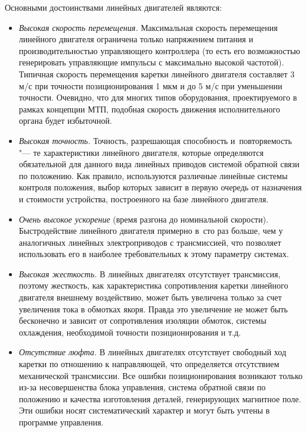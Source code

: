 Основными достоинствами линейных двигателей являются:

\begin{itemize}
	\item \textit{Высокая скорость перемещения.} Максимальная скорость перемещения линейного двигателя ограничена только напряжением питания и производительностью управляющего контроллера (то есть его возможностью генерировать управляющие импульсы с максимально высокой частотой). Типичная скорость перемещения каретки линейного двигателя составляет 3 м/с при точности позиционирования 1 мкм и до 5 м/с при уменьшении точности. Очевидно, что для многих типов оборудования, проектируемого в рамках концепции МТП, подобная скорость движения исполнительного органа будет избыточной.
	
	\item \textit{Высокая точность.} Точность, разрешающая способность и~повторяемость "--- те характеристики линейного двигателя, которые определяются обязательной для данного вида линейных приводов системой обратной связи по положению. Как правило, используются различные линейные системы контроля положения, выбор которых зависит в первую очередь от назначения и стоимости устройства, построенного на базе линейного двигателя.
	
	\item \textit{Очень высокое ускорение} (время разгона до номинальной скорости). Быстродействие линейного двигателя примерно в~сто раз больше, чем у аналогичных линейных электроприводов с трансмиссией, что позволяет использовать его в наиболее требовательных к этому параметру системах.
	
	\item \textit{Высокая жесткость.} В линейных двигателях отсутствует трансмиссия, поэтому жесткость, как характеристика сопротивления каретки линейного двигателя внешнему воздействию, может быть увеличена только за счет увеличения тока в обмотках якоря. Правда это увеличение не может быть бесконечно и зависит от сопротивления изоляции обмоток, системы охлаждения, необходимой точности позиционирования и т.\:д.
	
	\item \textit{Отсутствие люфта.} В линейных двигателях отсутствует свободный ход каретки по отношению к направляющей, что определяется отсутствием механической трансмиссии. Все ошибки позиционирования возникают только из-за несовершенства блока управления, система обратной связи по положению и качества изготовления деталей, генерирующих магнитное поле. Эти ошибки носят систематический характер и могут быть учтены в программе управления. 
\end{itemize}

